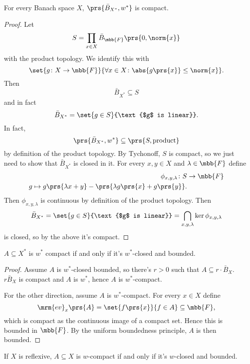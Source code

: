 \documentclass[10pt, twoside]{book}
\begin{document}

\begin{theorem}
For every Banach space $X$, $\prs{\bar{B}_{X^*}, w^*}$ is compact.
\end{theorem}

\begin{proof}
Let
\[S = \prod_{x \in X} \bar{B}_{\mbb{F}}\prs{0, \norm{x}}\]
with the product topology.
We identify this with
\[\set{g \colon X \to \mbb{F}}{\forall x \in X \colon \abs{g\prs{x}} \leq \norm{x}} \text{.}\]
Then
\[\bar{B}_{X^*} \subseteq S\]
and in fact
\[\bar{B}_{X^*} = \set{g \in S}{\text{$g$ is linear}} \text{.}\]
In fact, \[\prs{\bar{B}_{X^*}, w^*} \subseteq \prs{S, \text{product}}\]
by definition of the product topology.
By Tychonoff, $S$ is compact, so we just need to show that $\bar{B}_{X^*}$ is closed in it. For every $x,y \in X$ and $\lambda \in \mbb{F}$ define
\begin{align*}
\phi_{x,y,\lambda} \colon S &\to \mbb{F} \\
g \mapsto g\prs{\lambda x + y} - \prs{\lambda g\prs{x} + g\prs{y}} \text{.}
\end{align*}
Then $\phi_{x,y,\lambda}$ is continuous by definition of the product topology.
Then
\[\bar{B}_{X^*} = \set{g \in S}{\text{$g$ is linear}} = \bigcap_{x,y,\lambda} \ker \phi_{x,y,\lambda}\]
is closed, so by the above it's compact.
\end{proof}

\begin{corollary}
$A \subseteq X^*$ is $w^*$ compact if and only if it's $w^*$-closed and bounded.
\end{corollary}

\begin{proof}
Assume $A$ is $w^*$-closed bounded, so there's $r>0$ such that $A \subseteq r \cdot \bar{B}_X$. $r \bar{B}_X$ is compact and $A$ is $w^*$, hence $A$ is $w^*$-compact.

For the other direction, assume $A$ is $w^*$-compact. For every $x \in X$ define
\[\mrm{ev}_x\prs{A} = \set{f\prs{x}}{f \in A} \subseteq \mbb{F} \text{,}\]
which is compact as the continuous image of a compact set.
Hence this is bounded in $\mbb{F}$.
By the uniform boundedness principle, $A$ is then bounded.
\end{proof}

\begin{corollary}
If $X$ is reflexive, $A \subseteq X$ is $w$-compact if and only if it's $w$-closed and bounded.
\end{corollary}
\end{document}
